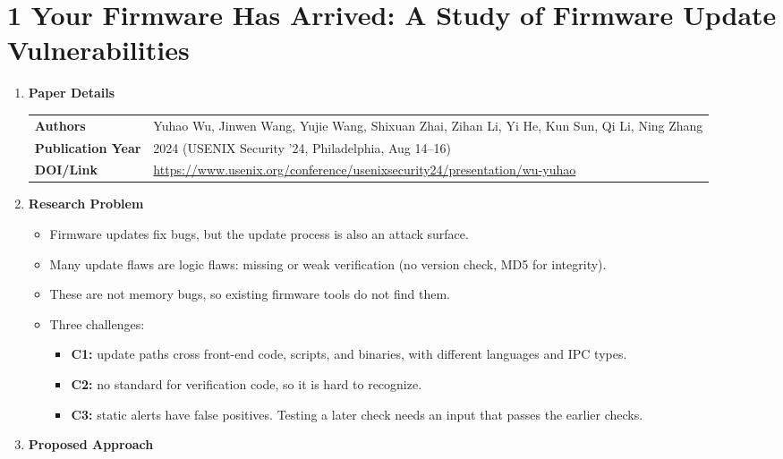 \documentclass[11pt,a4paper]{article}
\newcommand{\entrypart}[1]{\textbf{\color{accent}#1}\par\vspace{2pt}}
\begin{document}
\section{1 Your Firmware Has Arrived: A Study of Firmware Update Vulnerabilities}

\begin{enumerate}

    \item \entrypart{Paper Details}

    \begin{tabular}{@{}>{\bfseries}p{3.2cm} p{11.5cm}@{}}
        Authors          & Yuhao Wu, Jinwen Wang, Yujie Wang, Shixuan Zhai, Zihan Li, Yi He, Kun Sun, Qi Li, Ning Zhang \\[2pt]
        Publication Year & 2024 (USENIX Security '24, Philadelphia, Aug 14--16) \\[2pt]
        DOI/Link         & \url{https://www.usenix.org/conference/usenixsecurity24/presentation/wu-yuhao}
    \end{tabular}

    \item \entrypart{Research Problem}

    \begin{itemize}
        \item Firmware updates fix bugs, but the update process is also an attack surface.
        \item Many update flaws are logic flaws: missing or weak verification (no version check, MD5 for integrity).
        \item These are not memory bugs, so existing firmware tools do not find them.
        \item Three challenges:
        \begin{itemize}
            \item \textbf{C1:} update paths cross front-end code, scripts, and binaries, with different languages and IPC types.
            \item \textbf{C2:} no standard for verification code, so it is hard to recognize.
            \item \textbf{C3:} static alerts have false positives. Testing a later check needs an input that passes the earlier checks.
        \end{itemize}
    \end{itemize}

    \item \entrypart{Proposed Approach}


\end{enumerate}
\end{document}
